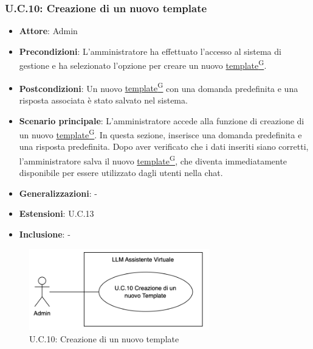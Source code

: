 \subsubsection{U.C.10: Creazione di un nuovo template}
\begin{itemize}
    \item \textbf{Attore}: Admin
    \item \textbf{Precondizioni}: L'amministratore ha effettuato l'accesso al sistema di gestione e ha selezionato l'opzione per creare un nuovo \href{https://code7crusaders.github.io/docs/PB/documentazione_interna/glossario.html#template}{template\textsuperscript{G}}.
    \item \textbf{Postcondizioni}: Un nuovo \href{https://code7crusaders.github.io/docs/PB/documentazione_interna/glossario.html#template}{template\textsuperscript{G}} con una domanda predefinita e una risposta associata è stato salvato nel sistema.
    \item \textbf{Scenario principale}: L'amministratore accede alla funzione di creazione di un nuovo \href{https://code7crusaders.github.io/docs/PB/documentazione_interna/glossario.html#template}{template\textsuperscript{G}}. In questa sezione, inserisce una domanda predefinita e una risposta predefinita. Dopo aver verificato che i dati inseriti siano corretti, l'amministratore salva il nuovo \href{https://code7crusaders.github.io/docs/PB/documentazione_interna/glossario.html#template}{template\textsuperscript{G}}, che diventa immediatamente disponibile per essere utilizzato dagli utenti nella chat.
    \item \textbf{Generalizzazioni}: -
    \item \textbf{Estensioni}: U.C.13
    \item \textbf{Inclusione}: -
\end{itemize}
\begin{figure}[H]
    \centering
    \includegraphics[width=0.7\textwidth]{img/UC10.png}
    \caption{U.C.10: Creazione di un nuovo template}
\end{figure}
\newpage

